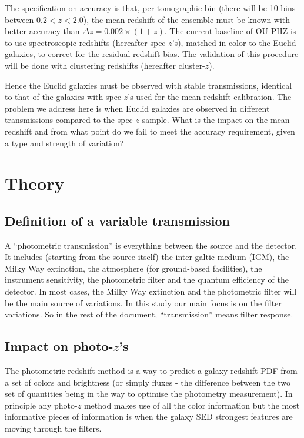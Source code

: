 \documentclass{article}
\begin{document}
The specification on accuracy is that, per tomographic bin (there will
be 10 bins between \(0.2 <z < 2.0\)), the mean redshift of the ensemble
must be known with better accuracy than \(\Delta z = 0.002\times(1+z)\).
The current baseline of OU-PHZ is to use spectroscopic redshifts
(hereafter spec-\(z\)'s), matched in color to the Euclid galaxies, to
correct for the residual redshift bias. The validation of this procedure
will be done with clustering redshifts (hereafter cluster-\(z\)).

Hence the Euclid galaxies must be observed with stable transmissions,
identical to that of the galaxies with spec-\(z\)'s used for the mean
redshift calibration. The problem we address here is when Euclid
galaxies are observed in different transmissions compared to the
spec-\(z\) sample. What is the impact on the mean redshift and from what
point do we fail to meet the accuracy requirement, given a type and
strength of variation?

\hypertarget{theory}{%
\section{Theory}\label{theory}}

\hypertarget{definition-of-a-variable-transmission}{%
\subsection{Definition of a variable
transmission}\label{definition-of-a-variable-transmission}}

A ``photometric transmission'' is everything between the source and the
detector. It includes (starting from the source itself) the inter-galtic
medium (IGM), the Milky Way extinction, the atmosphere (for ground-based
facilities), the instrument sensitivity, the photometric filter and the
quantum efficiency of the detector. In most cases, the Milky Way
extinction and the photometric filter will be the main source of
variations. In this study our main focus is on the filter variations. So
in the rest of the document, ``transmission'' means filter response.

\hypertarget{impact-on-photo-zs}{%
\subsection{\texorpdfstring{Impact on
photo-\(z\)'s}{Impact on photo-z's}}\label{impact-on-photo-zs}}

The photometric redshift method is a way to predict a galaxy redshift
PDF from a set of colors and brightness (or simply fluxes - the
difference between the two set of quantities being in the way to
optimise the photometry measurement). In principle any photo-\(z\)
method makes use of all the color information but the most informative
pieces of information is when the galaxy SED strongest features are
moving through the filters.
\end{document}

